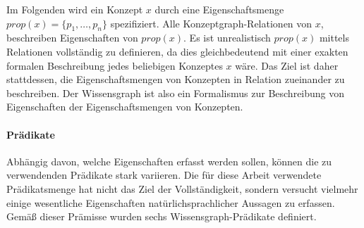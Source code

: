 Im Folgenden wird ein Konzept $x$ durch eine Eigenschaftsmenge $prop(x) = \{ p_1, \dots, p_n \}$ spezifiziert.
Alle Konzeptgraph-Relationen von $x$, beschreiben Eigenschaften von $prop(x)$.
Es ist unrealistisch $prop(x)$ mittels Relationen vollständig zu definieren, da dies gleichbedeutend mit einer exakten formalen Beschreibung jedes beliebigen Konzeptes $x$ wäre.
Das Ziel ist daher stattdessen, die Eigenschaftsmengen von Konzepten in Relation zueinander zu beschreiben.
Der Wissensgraph ist also ein Formalismus zur Beschreibung von Eigenschaften der Eigenschaftsmengen von Konzepten.

\paragraph{Prädikate}
Abhängig davon, welche Eigenschaften erfasst werden sollen, können die zu verwendenden Prädikate stark variieren.
Die für diese Arbeit verwendete Prädikatsmenge hat nicht das Ziel der Vollständigkeit, sondern versucht vielmehr einige wesentliche Eigenschaften natürlichsprachlicher Aussagen zu erfassen.
Gemäß dieser Prämisse wurden sechs Wissensgraph-Prädikate definiert.

